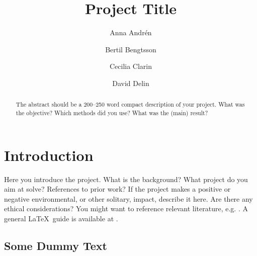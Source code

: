 \documentclass{LTHtwocol} %
\begin{document}
\begin{frontmatter}
\title{Project Title} %

\author[anna]{Anna Andrén}
\author[bertil]{Bertil Bengtsson}
\author[cecilia]{Cecilia Clarin}
\author[david]{David Delin}


\begin{abstract}
    The abstract should be a 200--250 word compact description of your project. What was the objective? Which methods did you use? What was the (main) result?
\end{abstract}

\end{frontmatter}


\section{Introduction}
Here you introduce the project. What is the background? What project do you aim at solve? References to prior work? If the project makes a positive or negative environmental, or other solitary, impact, describe it here. Are there any ethical considerations? You might want to reference relevant literature, e.g. \cite{openclosed2, Hellerstein2004, Yun2015}. A general \LaTeX\ guide is available at \cite{latexwiki}. 

\subsection{Some Dummy Text}
\kant[1] %
\end{document}
